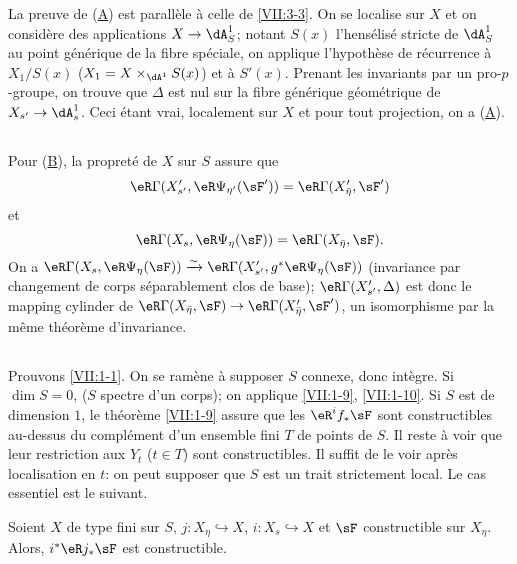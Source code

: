 La preuve de (\hyperlink{VII:3-A}{A}) est parallèle à celle de 
\ref{VII:3-3}. On se localise sur $X$ et on considère des applications 
$X\to \dA_S^1$; notant $S(x)$ l'hensélisé stricte de $\dA_S^1$ au point 
générique de la fibre spéciale, on applique l'hypothèse de récurrence 
à $X_1/S(x)$ ($X_1=X\times_{\dA^1} S(x)$) et à $S'(x)$. Prenant les 
invariants par un pro-$p$-groupe, on trouve que $\Delta$ est nul sur la fibre 
générique géométrique de $X_{s'} \to \dA_s^1$. Ceci étant vrai, 
localement sur $X$ et pour tout projection, on a (\hyperlink{VII:3-A}{A}). 





\subsection{}\label{VII:3-9}

Pour (\hyperlink{VII:3-B}{B}), la propreté de $X$ sur $S$ assure que 
\[
  \eR\Gamma(X_{s'}',\eR\Psi_{\eta'}(\sF')) = \eR\Gamma(X_{\bar\eta}',\sF') 
\]
et
\[
  \eR\Gamma(X_s,\eR\Psi_\eta(\sF)) = \eR\Gamma(X_{\bar\eta},\sF) \text{.} 
\]
On a 
$\eR\Gamma(X_s,\eR\Psi_\eta(\sF))\iso \eR\Gamma(X_{s'}',g^\ast\eR\Psi_\eta(\sF))$
(invariance par changement de corps séparablement clos de base); 
$\eR\Gamma(X_{s'}', \Delta)$ est donc le mapping cylinder de 
$\eR\Gamma(X_{\bar\eta},\sF) \to \eR\Gamma(X_{\bar\eta}',\sF')$, un 
isomorphisme par la même théorème d'invariance. 





\subsection{}\label{VII:3-10}

Prouvons \ref{VII:1-1}. On se ramène à supposer $S$ connexe, donc 
intègre. Si $\dim S=0$, ($S$ spectre d'un corps); on applique \ref{VII:1-9}, 
\ref{VII:1-10}. Si $S$ est de dimension $1$, le théorème \ref{VII:1-9} 
assure que les $\eR^i f_\ast \sF$ sont constructibles au-dessus du complément 
d'un ensemble fini $T$ de points de $S$. Il reste à voir que leur restriction 
aux $Y_t$ ($t\in T$) sont constructibles. Il suffit de le voir après 
localisation en $t$: on peut supposer que $S$ est un trait strictement local. 
Le cas essentiel est le suivant. 





\begin{lemma_}\label{VII:3-11}
Soient $X$ de type fini sur $S$, $j:X_\eta\hookrightarrow X$, 
$i:X_s\hookrightarrow X$ et $\sF$ constructible sur $X_\eta$. Alors, 
$i^\ast\eR j_\ast \sF$ est constructible. 
\end{lemma_}

